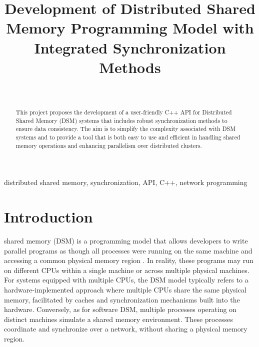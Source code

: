 \documentclass[journal]{IEEEtran}
\begin{document}
\title{Development of Distributed Shared Memory Programming Model with Integrated Synchronization Methods}

\author{ \\
}

\maketitle

\begin{abstract}
This project proposes the development of a user-friendly C++ API for Distributed Shared Memory (DSM) systems that includes robust synchronization methods to ensure data consistency. The aim is to simplify the complexity associated with DSM systems and to provide a tool that is both easy to use and efficient in handling shared memory operations and enhancing parallelism over distributed clusters.
\end{abstract}

\begin{IEEEkeywords}
distributed shared memory, synchronization, API, C++, network programming
\end{IEEEkeywords}

\section{Introduction}
 shared memory (DSM) is a programming model that allows developers to write parallel programs as though all processes were running on the same machine and accessing a common physical memory region \cite{nitzberg1991distributed}. In reality, these programs may run on different CPUs within a single machine or across multiple physical machines. For systems equipped with multiple CPUs, the DSM model typically refers to a hardware-implemented approach where multiple CPUs share the same physical memory, facilitated by caches and synchronization mechanisms built into the hardware. Conversely, as for software DSM, multiple processes operating on distinct machines simulate a shared memory environment. These processes coordinate and synchronize over a network, without sharing a physical memory region.
\end{document}
